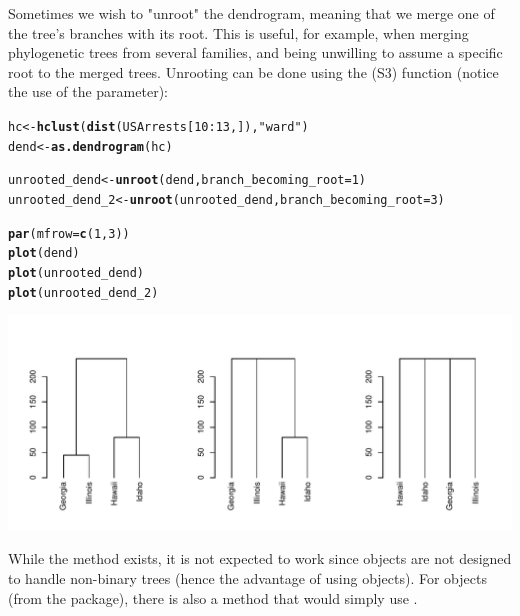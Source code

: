\documentclass[shortnames,nojss,article]{jss}\usepackage{graphicx, color}
\makeatletter
\def\maxwidth{ %
  \ifdim\Gin@nat@width>\linewidth
    \linewidth
  \else
    \Gin@nat@width
  \fi
}
\newcommand{\hlfunctioncall}[1]{\textcolor[rgb]{0.501960784313725,0,0.329411764705882}{\textbf{#1}}}%
\newcommand{\hlstring}[1]{\textcolor[rgb]{0.6,0.6,1}{#1}}%
\newenvironment{kframe}{%
 \def\at@end@of@kframe{}%
 \ifinner\ifhmode%
  \def\at@end@of@kframe{\end{minipage}}%
  \begin{minipage}{\columnwidth}%
 \fi\fi%
 \def\FrameCommand##1{\hskip\@totalleftmargin \hskip-\fboxsep
 \colorbox{shadecolor}{##1}\hskip-\fboxsep
     \hskip-\linewidth \hskip-\@totalleftmargin \hskip\columnwidth}%
 \MakeFramed {\advance\hsize-\width
   \@totalleftmargin\z@ \linewidth\hsize
   \@setminipage}}%
 {\par\unskip\endMakeFramed%
 \at@end@of@kframe}
\newenvironment{knitrout}{}{} %
\makeatother
\begin{document}
Sometimes we wish to "unroot" the dendrogram, meaning that we merge one of the tree's branches with its root. This is useful, for example, when merging phylogenetic trees from several families, and being unwilling to assume a specific root to the merged trees. Unrooting can be done using the  (S3) function (notice the use of the  parameter):


\begin{knitrout}
\color{fgcolor}\begin{kframe}
\begin{alltt}

hc <- \hlfunctioncall{hclust}(\hlfunctioncall{dist}(USArrests[10:13, ]), \hlstring{"ward"})
dend <- \hlfunctioncall{as.dendrogram}(hc)

unrooted_dend <- \hlfunctioncall{unroot}(dend, branch_becoming_root = 1)
unrooted_dend_2 <- \hlfunctioncall{unroot}(unrooted_dend, branch_becoming_root = 3)

\hlfunctioncall{par}(mfrow = \hlfunctioncall{c}(1, 3))
\hlfunctioncall{plot}(dend)
\hlfunctioncall{plot}(unrooted_dend)
\hlfunctioncall{plot}(unrooted_dend_2)
\end{alltt}
\end{kframe}

{\centering \includegraphics[width=\maxwidth]{figure/unnamed-chunk-21} 

}



\end{knitrout}


While the  method exists, it is not expected to work since  objects are not designed to handle non-binary trees (hence the advantage of using  objects). For  objects (from the  package), there is also a method that would simply use .
\end{document}
